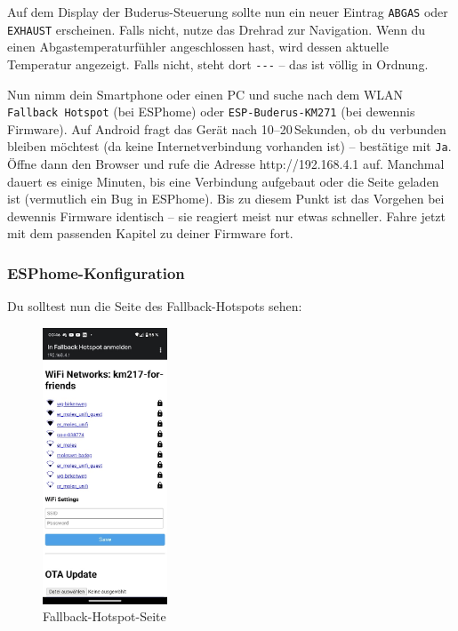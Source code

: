 \documentclass[
  9pt,
]{extarticle}
\begin{document}
Auf dem Display der Buderus-Steuerung sollte nun ein neuer Eintrag
\texttt{ABGAS} oder \texttt{EXHAUST} erscheinen. Falls nicht, nutze das
Drehrad zur Navigation. Wenn du einen Abgastemperaturfühler
angeschlossen hast, wird dessen aktuelle Temperatur angezeigt. Falls
nicht, steht dort \texttt{-\/-\/-} -- das ist völlig in Ordnung.

Nun nimm dein Smartphone oder einen PC und suche nach dem WLAN
\texttt{Fallback\ Hotspot} (bei ESPhome) oder \texttt{ESP-Buderus-KM271}
(bei dewennis Firmware). Auf Android fragt das Gerät nach
10--20\,Sekunden, ob du verbunden bleiben möchtest (da keine
Internetverbindung vorhanden ist) -- bestätige mit \texttt{Ja}. Öffne
dann den Browser und rufe die Adresse http://192.168.4.1 auf. Manchmal
dauert es einige Minuten, bis eine Verbindung aufgebaut oder die Seite
geladen ist (vermutlich ein Bug in ESPhome). Bis zu diesem Punkt ist das
Vorgehen bei dewennis Firmware identisch -- sie reagiert meist nur etwas
schneller. Fahre jetzt mit dem passenden Kapitel zu deiner Firmware
fort.

\subsubsection{ESPhome-Konfiguration}\label{esphome-konfiguration}

Du solltest nun die Seite des Fallback-Hotspots sehen:

  \begin{figure}
    \centering
    \includegraphics[width=0.33\textwidth]{../IMG/esphome-fallback-page.png}
    \caption{Fallback-Hotspot-Seite}
  \end{figure}
  
\end{document}
